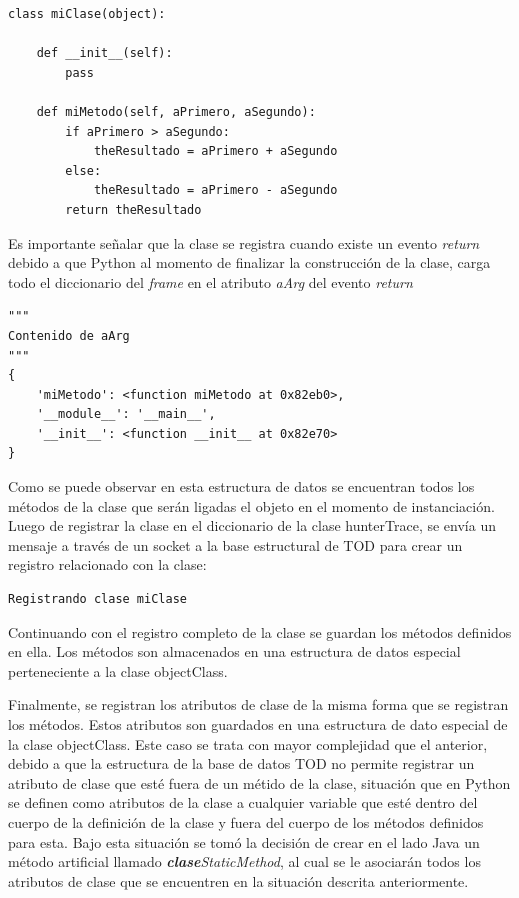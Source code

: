 \documentclass[12pt,legalpaper]{report}
\begin{document}
\begin{singlespace}
\begin{lstlisting}[style=Python]
class miClase(object):

    def __init__(self):
        pass
    
    def miMetodo(self, aPrimero, aSegundo):
        if aPrimero > aSegundo:
            theResultado = aPrimero + aSegundo
        else:
            theResultado = aPrimero - aSegundo
        return theResultado
\end{lstlisting}
\end{singlespace}

Es importante señalar que la clase se registra cuando existe un evento \textit{return} debido a que Python al momento de finalizar la construcción de la clase, carga todo el diccionario del \textit{frame} en el atributo \textit{aArg} del evento \textit{return} \cite{bytecode} 

\begin{singlespace}
\begin{lstlisting}[style=consola,numbers=none]
"""
Contenido de aArg
"""
{
	'miMetodo': <function miMetodo at 0x82eb0>, 
	'__module__': '__main__',
	'__init__': <function __init__ at 0x82e70>
}

\end{lstlisting}
\end{singlespace}

Como se puede observar en esta estructura de datos se encuentran todos los métodos de la clase que serán ligadas el objeto en el momento de instanciación.  Luego de registrar la clase en el diccionario de la clase hunterTrace, se envía un mensaje a través de un socket a la base estructural de TOD para crear un registro relacionado con la clase:

\begin{singlespace}
\begin{lstlisting}[style=consola,numbers=none]
Registrando clase miClase
\end{lstlisting}
\end{singlespace}

Continuando con el registro completo de la clase se guardan los métodos definidos en ella.  Los métodos son almacenados en una estructura de datos especial perteneciente a la clase objectClass.

Finalmente, se registran los atributos de clase de la misma forma que se registran los métodos.  Estos atributos son guardados en una estructura de dato especial de la clase objectClass.  Este caso se trata con mayor complejidad que el anterior, debido a que la estructura de la base de datos TOD no permite registrar un atributo de clase que esté fuera de un métido de la clase, situación que en Python se definen como atributos de la clase a cualquier variable que esté dentro del cuerpo de la definición de la clase y fuera del cuerpo de los métodos definidos para esta.  Bajo esta situación se tomó la decisión de crear en el lado Java un método artificial llamado \textit{\textbf{clase}StaticMethod}, al cual se le asociarán todos los atributos de clase que se encuentren en la situación descrita anteriormente.
\end{document}
